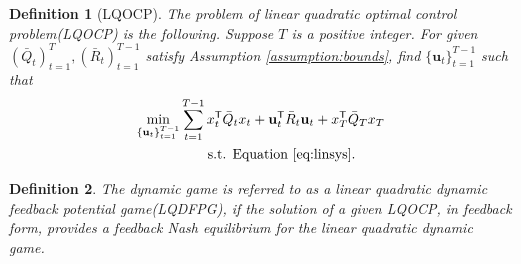 \documentclass[letterpaper, 10 pt, conference]{ieeeconf}  %
\newcommand{\transpose}{\mathsf{T}}
\newtheorem{definition}{Definition}
\begin{document}
\begin{definition}[LQOCP]\label{def:LQOCP}
    The problem of linear quadratic optimal control problem(LQOCP) is the following.
    Suppose $T$ is a positive integer. For given $(\bar{Q}_{t})_{t=1}^{T},(\bar{R}_{t})_{t=1}^{T-1}$ satisfy Assumption \ref{assumption:bounds}, find $\{\mathbf{u}_{t}\}_{t=1}^{T-1}$ such that
    \begin{equation}\label{eq:LQOCP}
\begin{split}
    \min_{\{\mathbf{u}_{t}\}_{t=1}^{T-1}}& \sum_{t=1}^{T-1} x_{t}^{\transpose}\bar{Q}_{t}x_{t} + \mathbf{u}_{t}^{\transpose}\bar{R}_{t}\mathbf{u}_{t} + x_{T}^{\transpose}\bar{Q}_{T}x_{T}\\
    &\text{\qquad s.t. Equation \eqref{eq:linsys}}.
\end{split}
\end{equation}
\end{definition}
\begin{definition}
    The dynamic game is referred to as a linear quadratic dynamic feedback potential game(LQDFPG), if the solution of a given LQOCP, in feedback form, provides a feedback Nash equilibrium for the linear quadratic dynamic game. 
\end{definition}
\end{document}
